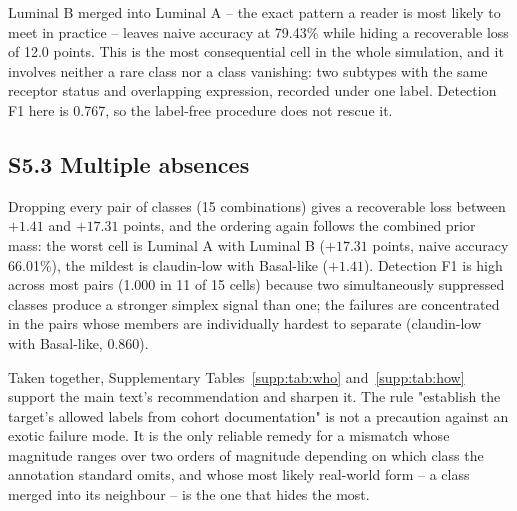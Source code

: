 \documentclass[11pt,a4paper]{article}
\begin{document}
Luminal B merged into Luminal A -- the exact pattern a reader is most likely to meet in
practice -- leaves naive accuracy at 79.43\% while hiding a recoverable loss of 12.0
points. This is the most consequential cell in the whole simulation, and it involves
neither a rare class nor a class vanishing: two subtypes with the same receptor status
and overlapping expression, recorded under one label. Detection F1 here is 0.767, so the
label-free procedure does not rescue it.

\subsection*{S5.3 Multiple absences}

Dropping every pair of classes (15 combinations) gives a recoverable loss between
$+1.41$ and $+17.31$ points, and the ordering again follows the combined prior mass:
the worst cell is Luminal A with Luminal B ($+17.31$ points, naive accuracy 66.01\%),
the mildest is claudin-low with Basal-like ($+1.41$). Detection F1 is high across most
pairs (1.000 in 11 of 15 cells) because two simultaneously suppressed classes produce a
stronger simplex signal than one; the failures are concentrated in the pairs whose
members are individually hardest to separate (claudin-low with Basal-like, 0.860).

Taken together, Supplementary Tables~\ref{supp:tab:who} and~\ref{supp:tab:how} support
the main text's recommendation and sharpen it. The rule "establish the target's allowed
labels from cohort documentation" is not a precaution against an exotic failure mode. It
is the only reliable remedy for a mismatch whose magnitude ranges over two orders of
magnitude depending on which class the annotation standard omits, and whose most likely
real-world form -- a class merged into its neighbour -- is the one that hides the most.
\end{document}

